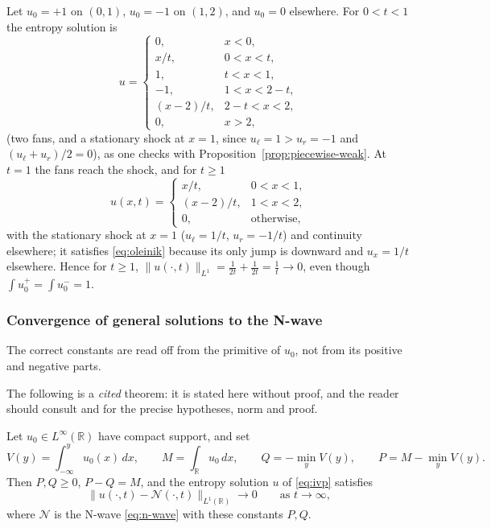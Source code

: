 \begin{example}[Cancellation]
\label{ex:cancellation}
Let $u_0=+1$ on $(0,1)$, $u_0=-1$ on $(1,2)$, and $u_0=0$ elsewhere. For
$0<t<1$ the entropy solution is
\begin{equation*}
  u=\begin{cases}
    0,&x<0,\\ x/t,&0<x<t,\\ 1,&t<x<1,\\ -1,&1<x<2-t,\\
    (x-2)/t,&2-t<x<2,\\ 0,&x>2,
  \end{cases}
\end{equation*}
(two fans, and a stationary shock at $x=1$, since $u_\ell=1>u_r=-1$ and
$(u_\ell+u_r)/2=0$), as one checks with
Proposition~\ref{prop:piecewise-weak}. At $t=1$ the fans reach the shock,
and for $t\ge1$
\begin{equation*}
  u(x,t)=\begin{cases}
    x/t,&0<x<1,\\ (x-2)/t,&1<x<2,\\ 0,&\text{otherwise,}
  \end{cases}
\end{equation*}
with the stationary shock at $x=1$ ($u_\ell=1/t$, $u_r=-1/t$) and
continuity elsewhere; it satisfies \eqref{eq:oleinik} because its only
jump is downward and $u_x=1/t$ elsewhere. Hence for $t\ge1$,
$\|u(\cdot,t)\|_{L^1}=\frac1{2t}+\frac1{2t}=\frac1t\to0$, even though
$\int u_0^+=\int u_0^-=1$.
\end{example}

\subsubsection{Convergence of general solutions to the N-wave}
\label{subsubsec:n-wave-convergence}

The correct constants are read off from the primitive of $u_0$, not from
its positive and negative parts.

\noindent The following is a \emph{cited} theorem: it is stated here without
proof, and the reader should consult \cite{lax1957} and
\cite[\S3.4.5]{evans2010} for the precise hypotheses, norm and proof.

\begin{theorem}
\label{thm:n-wave-decay}
Let $u_0 \in L^\infty(\mathbb{R})$ have compact support, and set
\begin{equation}
  \label{eq:pq-areas}
  V(y)=\int_{-\infty}^y u_0(x)\,dx,\qquad M=\int_{\mathbb{R}}u_0\,dx,\qquad
  Q=-\min_y V(y),\qquad P=M-\min_y V(y).
\end{equation}
Then $P,Q\ge0$, $P-Q=M$, and the entropy solution $u$ of \eqref{eq:ivp}
satisfies
\begin{equation}
  \|u(\cdot,t) - \mathcal{N}(\cdot,t)\|_{L^1(\mathbb{R})} \to 0 \qquad \text{as } t \to \infty,
\end{equation}
where $\mathcal{N}$ is the N-wave \eqref{eq:n-wave} with these constants $P,Q$.
\end{theorem}

